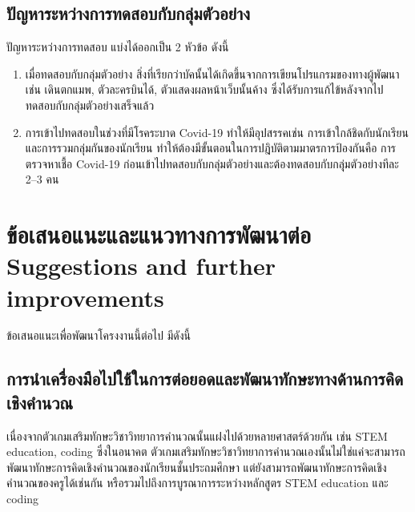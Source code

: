 \subsection{ปัญหาระหว่างการทดสอบกับกลุ่มตัวอย่าง}
ปัญหาระหว่างการทดสอบ แบ่งได้ออกเป็น 2 หัวข้อ ดังนี้
\begin{enumerate}
    \item เมื่อทดสอบกับกลุ่มตัวอย่าง สิ่งที่เรียกว่าบัคนั้นได้เกิดขึ้นจากการเขียนโปรแกรมของทางผู้พัฒนา เช่น เดินตกแมพ, ตัวละครบินได้, ตัวแสดงผลหน้าเว็บนั้นค้าง ซึ่งได้รับการแก้ไข้หลังจากไปทดสอบกับกลุ่มตัวอย่างเสร็จแล้ว
    \item การเข้าไปทดสอบในช่วงที่มีโรคระบาด Covid-19 ทำให้มีอุปสรรคเช่น การเข้าใกล้ชิดกับนักเรียนและการรวมกลุ่มกันของนักเรียน ทำให้ต้องมีขั้นตอนในการปฎิบัติตามมาตรการป้องกันคือ การตรวจหาเชื้อ Covid-19 ก่อนเข้าไปทดสอบกับกลุ่มตัวอย่างและต้องทดสอบกับกลุุ่มตัวอย่างทีละ 2--3 คน
\end{enumerate}

\section{\ifcpe%
ข้อเสนอแนะและแนวทางการพัฒนาต่อ
\else%
Suggestions and further improvements
\fi
}
ข้อเสนอแนะเพื่อพัฒนาโครงงานนี้ต่อไป มีดังนี้
\subsection{การนำเครื่องมือไปใช้ในการต่อยอดและพัฒนาทักษะทางด้านการคิดเชิงคำนวณ}
เนื่องจากตัวเกมเสริมทักษะวิชาวิทยาการคำนวณนั้นแฝงไปด้วยหลายศาสตร์ด้วยกัน เช่น STEM education, coding
ซึ่งในอนาคต ตัวเกมเสริมทักษะวิชาวิทยาการคำนวณเองนั้นไม่ใช่แค่จะสามารถพัฒนาทักษะการคิดเชิงคำนวณของนักเรียนชั้นประถมศึกษา
แต่ยังสามารถพัฒนาทักษะการคิดเชิงคำนวณของครูได้เช่นกัน หรือรวมไปถึงการบูรณาการระหว่างหลักสูตร STEM education และ coding

